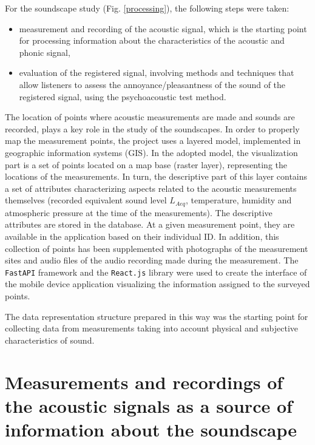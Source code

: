 \documentclass[a4paper,10pt]{article}
\begin{document}
\begin{multicols}{2}

For the soundscape study (Fig. \ref{processing}), the following steps were
  taken:
\begin{itemize}
  \item measurement and recording of the acoustic signal, which is the starting
    point for processing information about the characteristics of the acoustic
    and phonic signal,
  \item evaluation of the registered signal, involving methods and techniques
    that allow listeners to assess the annoyance/pleasantness of the sound of
    the registered signal, using the psychoacoustic test method.
\end{itemize}

The location of points where acoustic measurements are made and sounds are
  recorded, plays a key role in the study of the soundscapes. In order to
  properly map the measurement points, the project uses a layered model,
  implemented in geographic information systems (GIS). In the adopted model, the
  visualization part is a set of points located on a map base (raster layer),
  representing the locations of the measurements. In turn, the descriptive part
  of this layer contains a set of attributes characterizing aspects related to
  the acoustic measurements themselves (recorded equivalent sound level
  $L_{Aeq}$, temperature, humidity and atmospheric pressure at the time of the
  measurements). The descriptive attributes are stored in the database. At a
  given measurement point, they are available in the application based on their
  individual ID. In addition, this collection of points has been supplemented
  with photographs of the measurement sites and audio files of the audio
  recording made during the measurement. The \texttt{FastAPI} framework and the
  \texttt{React.js} library were used to create the interface of the mobile
  device application visualizing the information assigned to the surveyed
  points.

The data representation structure prepared in this way was the starting point
for collecting data from measurements taking into account physical and
subjective characteristics of sound.

\end{multicols}
\section{Measurements and recordings of the acoustic signals as a source of
  information about the soundscape}
\end{document}
